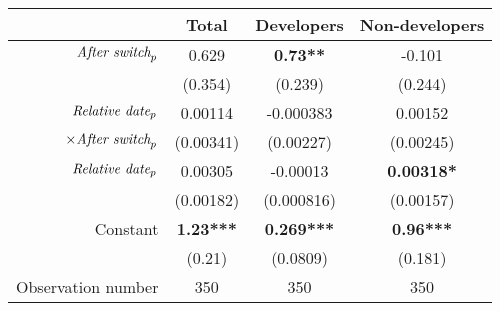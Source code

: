 \begin{tabular}{|r|c|c|c|}
\hline
&  Total & Developers & Non-developers \\
\hline
$\mbox{\emph{After switch}}_p$ & 0.629 & \textbf{0.73**} & -0.101 \\
 & (0.354) & (0.239) & (0.244) \\
\hline
$\mbox{\emph{Relative date}}_p$ & 0.00114 & -0.000383 & 0.00152 \\
$\times \mbox{\emph{After switch}}_p$ & (0.00341) & (0.00227) & (0.00245) \\
\hline
$\mbox{\emph{Relative date}}_p$ & 0.00305 & -0.00013 & \textbf{0.00318*} \\
 & (0.00182) & (0.000816) & (0.00157) \\
\hline
Constant & \textbf{1.23***} & \textbf{0.269***} & \textbf{0.96***} \\
 & (0.21) & (0.0809) & (0.181) \\
\hline
Observation number & 350 & 350 & 350 \\
\hline
\end{tabular}
